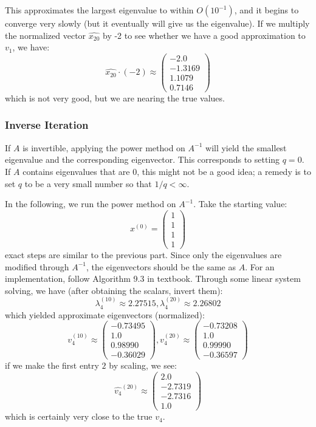 \documentclass[12pt]{article} %
\newcommand{\1}[1]{\mathds{1}\left[#1\right]}
\begin{document}
This approximates the largest eigenvalue to within $O(10^{-1})$, and it begins to converge very slowly (but it eventually will give us the eigenvalue). If we multiply the normalized vector $\widehat{x_{20}}$ by -2 to see whether we have a good approximation to $v_1$, we have:
$$
	\widehat{x_{20}}\cdot (-2) \approx 
	\begin{pmatrix}
	-2.0\\  -1.3169\\  1.1079\\  0.7146
	\end{pmatrix}
$$ which is not very good, but we are nearing the true values.
\subsubsection{Inverse Iteration}
If $A$ is invertible, applying the power method on $A^{-1}$ will yield the smallest eigenvalue and the corresponding eigenvector. This corresponds to setting $q=0$. If $A$ contains eigenvalues that are 0, this might not be a good idea; a remedy is to set $q$ to be a very small number so that $1/q <\infty$. 

In the following, we run the power method on $A^{-1}$. Take the starting value:
$$
	x^{(0)} = 
	\begin{pmatrix}
		1\\
		1\\
		1\\
		1
	\end{pmatrix}
$$ exact steps are similar to the previous part. Since only the eigenvalues are modified through $A^{-1}$, the eigenvectors should be the same as $A$. For an implementation, follow Algorithm 9.3 in textbook. Through some linear system solving, we have (after obtaining the scalars, invert them):
$$
\lambda_{4}^{(10)}\approx 2.27515, \lambda_{4}^{(20)}\approx 2.26802
$$ which yielded approximate eigenvectors (normalized):
$$
	v_4^{(10)} \approx 
	\begin{pmatrix}
		-0.73495\\  1.0\\ 0.98990 \\ -0.36029
	\end{pmatrix},
	v_4^{(20)} \approx
	\begin{pmatrix}
		-0.73208\\  1.0\\0.99990\\ -0.36597 
	\end{pmatrix}
$$ if we make the first entry $2$ by scaling, we see:
$$
	\widehat{v_4}^{(20)}\approx 
	\begin{pmatrix}
		2.0\\  -2.7319\\  -2.7316\\1.0
	\end{pmatrix}
$$ which is certainly very close to the true $v_4$.
\end{document}
